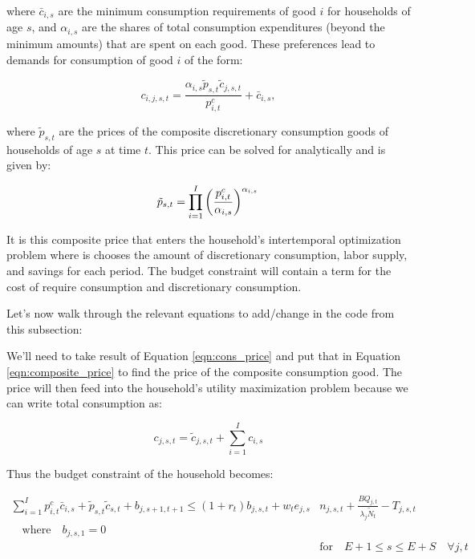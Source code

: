 \documentclass[letterpaper,12pt]{article}
\theoremstyle{definition}
\begin{document}
 \noindent\noindent where $\bar{c}_{i,s}$ are the minimum consumption requirements of good $i$ for households of age $s$, and $\alpha_{i,s}$ are the shares of total consumption expenditures (beyond the minimum amounts) that are spent on each good.  These preferences lead to demands for consumption of good $i$ of the form:
 
\begin{equation} \label{eqn:cons_solve}
c_{i,j,s,t}  = \frac{\alpha_{i,s} \tilde{p}_{s,t}\tilde{c}_{j,s,t}}{p^{c}_{i,t}} + \bar{c}_{i,s},  	
\end{equation}

\noindent\noindent where $\tilde{p}_{s,t}$ are the prices of the composite discretionary consumption goods of households of age $s$ at time $t$.  This price can be solved for analytically and is given by:

\begin{equation} \label{eqn:composite_price}
\tilde{p}_{s,t} =  \prod_{i=1}^{I}\left( \frac{p^{c}_{i,t}}{\alpha_{i,s}} \right)^{\alpha_{i,s}} \\
\end{equation}

It is this composite price that enters the household's intertemporal optimization problem where is chooses the amount of discretionary consumption, labor supply, and savings for each period.  The budget constraint will contain a term for the cost of require consumption and discretionary consumption.  

Let's now walk through the relevant equations to add/change in the code from this subsection:

We'll need to take result of Equation \ref{eqn:cons_price} and put that in Equation \ref{eqn:composite_price} to find the price of the composite consumption good.  The price will then feed into the household's utility maximization problem because we can write total consumption as:

\begin{equation}
\label{eqn:total_cons}
c_{j,s,t}=\tilde{c}_{j,s,t}+\sum_{i=1}^{I}c_{i,s} 
\end{equation}

\noindent\noindent Thus the budget constraint of the household becomes:

\begin{equation}\label{EqBC}
\begin{split}
\sum_{i=1}^{I} p^{c}_{i,t}\bar{c}_{i,s} + \tilde{p}_{s,t}\tilde{c}_{s,t} + b_{j,s+1,t+1} \leq \left(1 + r_t\right) b_{j,s,t} + w_t e_{j,s}&n_{j,s,t} + \frac{BQ_{j,t}}{\lambda_j\tilde{N}_t} - T_{j,s,t} \\
\quad\text{where}\quad b_{j,s,1} = 0 \\
&\text{for} \quad E+1\leq s \leq E+S \quad \forall j,t
\end{split}
\end{equation} 
\end{document}
